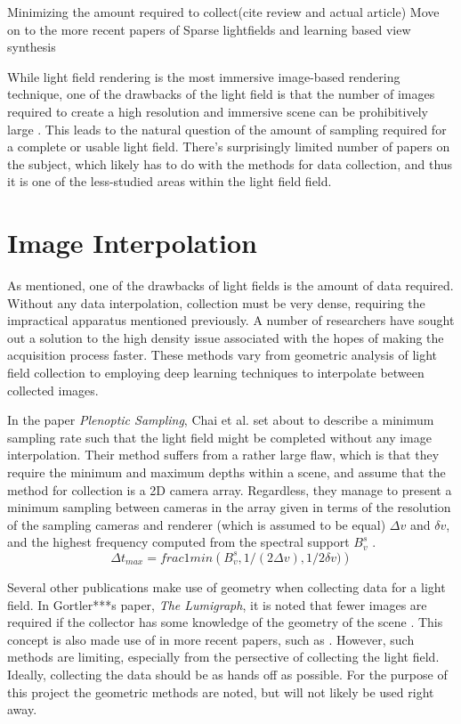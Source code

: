 \documentclass[12pt]{report}
\begin{document}
Minimizing the amount required to collect(cite review and actual article)
Move on to the more recent papers of Sparse lightfields and learning 
based view synthesis

\cite{Ng06}
\cite{Davis12}
\cite{Oberlin16}


While light field rendering is the most immersive image-based rendering technique, one of the drawbacks of the light field is that the number of images required to create a high resolution and immersive scene can be prohibitively large \cite{Anderson16}. This leads to the natural question of the amount of sampling required for a complete or usable light field. There's surprisingly limited number of papers on the subject, which likely has to do with the methods for data collection, and thus it is one of the less-studied areas within the light field field.

\section{Image Interpolation}
As mentioned, one of the drawbacks of light fields is the amount of data required. Without any data interpolation, collection must be very dense, requiring the impractical apparatus mentioned previously. A number of researchers have sought out a solution to the high density issue associated with the hopes of making the acquisition process faster. These methods vary from geometric analysis of light field collection to employing deep learning techniques to interpolate between collected images.

In the paper \emph{Plenoptic Sampling}, Chai et al. set about to describe a minimum sampling rate such that the light field might be completed without any image interpolation. Their method suffers from a rather large flaw, which is that they require the minimum and maximum depths within a scene, and assume that the method for collection is a 2D camera array. Regardless, they manage to present a minimum sampling between cameras in the array given in terms of the resolution of the sampling cameras and renderer (which is assumed to be equal) $\Delta v$ and $\delta v$, and the highest frequency computed from the spectral support $B_v^s$ \cite{Chai00}. 
\begin{equation}
\Delta t_{max} = frac{1}{min \left(B_v^s, 1/(2 \Delta v), 1/2 \delta v)\right) }
\end{equation}

Several other publications make use of geometry when collecting data for a light field. In Gortler***s paper, \emph{The Lumigraph}, it is noted that fewer images are required if the collector has some knowledge of the geometry of the scene \cite{Gortler96}. This concept is also made use of in more recent papers, such as \cite{Kim13}. However, such methods are limiting, especially from the persective of collecting the light field. Ideally, collecting the data should be as hands off as possible. For the purpose of this project the geometric methods are noted, but will not likely be used right away. 
\end{document}
